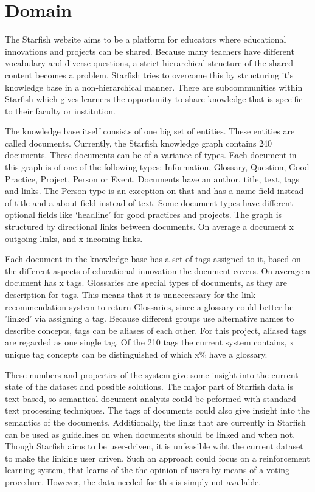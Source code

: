 

\section{Domain}
The Starfish website aims to be a platform for educators where educational innovations and projects can be shared. Because many teachers have different vocabulary and diverse questions, a strict hierarchical structure of the shared content becomes a problem. Starfish tries to overcome this by structuring it's knowledge base in a non-hierarchical manner. There are subcommunities within Starfish which gives learners the opportunity to share knowledge that is specific to their faculty or institution. 

The knowledge base itself consists of one big set of entities. These entities are called documents. Currently, the Starfish knowledge graph contains 240 documents. These documents can be of a variance of types. Each document in this graph is of one of the following types: Information, Glossary, Question, Good Practice, Project, Person or Event. Documents have an author, title, text, tags and links. The Person type is an exception on that and has a name-field instead of title and a about-field instead of text. Some document types have different optional fields like `headline' for good practices and projects. The graph is structured by directional links between documents.  On average a document x outgoing links, and x incoming links.

Each document in the knowledge base has a set of tags assigned to it, based on the different aspects of educational innovation the document covers. On average a document has x tags. Glossaries are special types of documents, as they are description for tags. This means that it is unneccessary for the link recommendation system to return Glossaries, since a glossary could better be 'linked' via assigning a tag. Because different groups use alternative names to describe concepts, tags can be aliases of each other. For this project, aliased tags are regarded as one single tag. Of the 210 tags the current system contains, x unique tag concepts can be distinguished of which x\% have a glossary. 

These numbers and properties of the system give some insight into the current state of the dataset and possible solutions. The major part of Starfish data is text-based, so semantical document analysis could be peformed with standard text processing techniques. The tags of documents could also give insight into the semantics of the documents. Additionally, the links that are currently in Starfish can be used as guidelines on when documents should be linked and when not. Though Starfish aims to be user-driven, it is unfeasible wiht the current dataset to make the linking user driven. Such an approach could focus on a reinforcement learning system, that learns of the the opinion of users by means of a voting procedure. However, the data needed for this is simply not available. 
